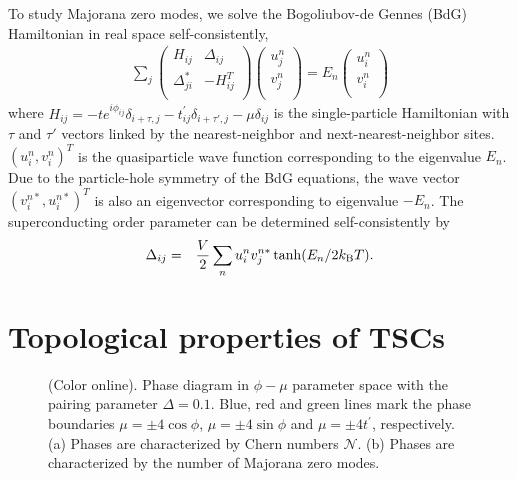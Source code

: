 \documentclass[12pt]{iopart}
\begin{document}
To study Majorana zero modes, we solve the Bogoliubov-de Gennes (BdG) Hamiltonian in real space self-consistently,
\begin{eqnarray}
    \sum_{j}\left(
              \begin{array}{ccc}
                 H_{ij} & \Delta_{ij}\\
                \Delta_{ji}^{*} & -H_{ij}^{T} \\
              \end{array}
            \right)
            \left(
              \begin{array}{ccc}
                 u_{j}^{n}\\
                 v_{j}^{n}\\
              \end{array}
            \right)
            =E_{n}\left(
              \begin{array}{ccc}
                 u_{i}^{n}\\
                 v_{i}^{n}\\
              \end{array}
            \right)
\end{eqnarray}
where $H_{ij}=-te^{i\phi_{ij}}\delta_{i+\tau,j}-t^{\prime}_{ij}\delta_{i+\tau',j}-\mu\delta_{ij}$
is the single-particle Hamiltonian with $\tau$ and $\tau'$ vectors
linked by the nearest-neighbor and next-nearest-neighbor sites. $\left(u_{i}^{n},
v_{i}^{n}\right)^{T}$ is the quasiparticle wave function
corresponding to the eigenvalue $E_{n}$. Due to the particle-hole
symmetry of the BdG equations, the wave vector $\left(v_{i}^{n*},
u_{i}^{n*}\right)^{T}$ is also an eigenvector corresponding to
eigenvalue $-E_{n}$. The superconducting order parameter can be
determined self-consistently by
\begin{eqnarray}
    \Delta_{ij}&=&\frac{V}{2}\sum_{n}u_{i}^{n}v_{j}^{n*}\tanh(E_{n}/2k_{\rm B}T).
\end{eqnarray}


\section{Topological properties of TSCs}
\label{Sec.3}
\begin{figure}[!htb] \centering{}
\caption{(Color online). Phase diagram in $\phi-\mu$ parameter space with the pairing parameter $\Delta=0.1$. Blue, red and green lines mark the phase boundaries $\mu=\pm4\cos\phi$, $\mu=\pm4\sin\phi$ and $\mu=\pm4t^{\prime}$, respectively. (a) Phases are characterized by Chern numbers $\mathcal{N}$. (b) Phases are characterized by the number of Majorana zero modes.}\label{fig:subfig}\label{f.2}
\end{figure}
\end{document}
